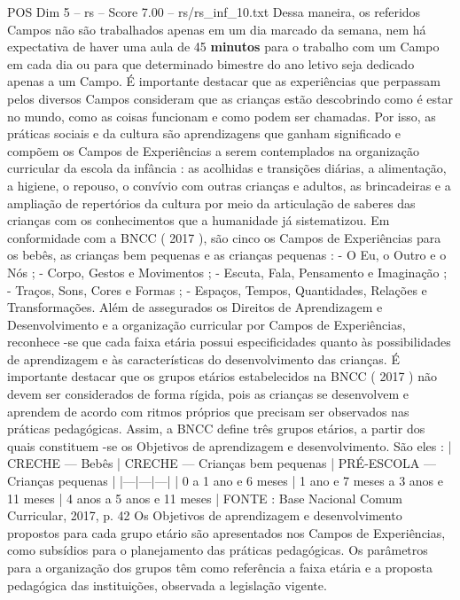 \begin{textsample}{POS Dim 5 – rs – Score 7.00 – rs/rs\_inf\_10.txt}
Dessa maneira, os referidos Campos não são trabalhados apenas em um dia marcado da semana, nem há expectativa de haver uma aula de 45 \textbf{minutos} para o trabalho com um Campo em cada dia ou para que determinado bimestre do ano letivo seja dedicado apenas a um Campo.
É importante destacar que as experiências que perpassam pelos diversos Campos consideram que as crianças estão descobrindo como é estar no mundo, como as coisas funcionam e como podem ser chamadas.
Por isso, as práticas sociais e da cultura são aprendizagens que ganham significado e compõem os Campos de Experiências a serem contemplados na organização curricular da escola da infância : as acolhidas e transições diárias, a alimentação, a higiene, o repouso, o convívio com outras crianças e adultos, as brincadeiras e a ampliação de repertórios da cultura por meio da articulação de saberes das crianças com os conhecimentos que a humanidade já sistematizou.
Em conformidade com a BNCC ( 2017 ), são cinco os Campos de Experiências para os bebês, as crianças bem pequenas e as crianças pequenas : - O Eu, o Outro e o Nós ; - Corpo, Gestos e Movimentos ; - Escuta, Fala, Pensamento e Imaginação ; - Traços, Sons, Cores e Formas ; - Espaços, Tempos, Quantidades, Relações e Transformações.
Além de assegurados os Direitos de Aprendizagem e Desenvolvimento e a organização curricular por Campos de Experiências, reconhece -se que cada faixa etária possui especificidades quanto às possibilidades de aprendizagem e às características do desenvolvimento das crianças.
É importante destacar que os grupos etários estabelecidos na BNCC ( 2017 ) não devem ser considerados de forma rígida, pois as crianças se desenvolvem e aprendem de acordo com ritmos próprios que precisam ser observados nas práticas pedagógicas.
Assim, a BNCC define três grupos etários, a partir dos quais constituem -se os Objetivos de aprendizagem e desenvolvimento.
São eles : | CRECHE — Bebês | CRECHE — Crianças bem pequenas | PRÉ-ESCOLA — Crianças pequenas | |---|---|---| | 0 a 1 ano e 6 meses | 1 ano e 7 meses a 3 anos e 11 meses | 4 anos a 5 anos e 11 meses | FONTE : Base Nacional Comum Curricular, 2017, p. 42 Os Objetivos de aprendizagem e desenvolvimento propostos para cada grupo etário são apresentados nos Campos de Experiências, como subsídios para o planejamento das práticas pedagógicas.
Os parâmetros para a organização dos grupos têm como referência a faixa etária e a proposta pedagógica das instituições, observada a legislação vigente.

\end{textsample}

